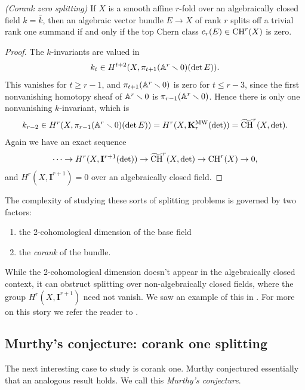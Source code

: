 \documentclass[11pt,openany]{book}
\providecommand{\KMW}{\mathbf{K}^\mathrm{MW}}
\providecommand{\CHW}{\widetilde{\mathrm{CH}}}
\begin{document}
\begin{theorem} \textit{(Corank zero splitting)} If $X$ is a smooth affine $r$-fold over an algebraically closed field $k = \bar{k}$, then an algebraic vector bundle $E \to X$ of rank $r$ splits off a trivial rank one summand if and only if the top Chern class $c_r(E) \in \mathrm{CH}^r(X)$ is zero.
\end{theorem}
\begin{proof} The $k$-invariants are valued in
\begin{align*}
    k_t \in H^{t+2}(X, \pi_{t+1}(\mathbb{A}^r\smallsetminus 0)(\det E)).
\end{align*}
This vanishes for $t\ge r-1$, and $\pi_{t+1}(\mathbb{A}^r\smallsetminus 0)$ is zero for $t \le r-3$, since the first nonvanishing homotopy sheaf of $\mathbb{A}^r\smallsetminus 0$ is $\pi_{r-1}(\mathbb{A}^r\smallsetminus 0)$. Hence there is only one nonvanishing $k$-invariant, which is
\begin{align*}
    k_{r-2} \in H^{r}(X, \pi_{r-1}(\A^r\minus 0)(\det E)) = H^r(X,\KMW_r(\det)) = \CHW^r(X,\det).
\end{align*}
%
Again we have an exact sequence
\begin{align*}
    \cdots \to H^r(X,\mathbf{I}^{r+1}(\det)) \to \CHW^r(X,\det) \to \CH^r(X) \to 0,
\end{align*}
and $H^r(X,\mathbf{I}^{r+1}) = 0$ over an algebraically closed field.
\end{proof}


The complexity of studying these sorts of splitting problems is governed by two factors:
\begin{enumerate}
    \item the 2-cohomological dimension of the base field
    \item the \textit{corank} of the bundle.
\end{enumerate}

While the 2-cohomological dimension doesn't appear in the algebraically closed context, it can obstruct splitting over non-algebraically closed fields, where the group $H^r(X,\mathbf{I}^{r+1})$ need not vanish. We saw an example of this in . For more on this story we refer the reader to \cite{AF2}.

\subsection{Murthy's conjecture: corank one splitting}



The next interesting case to study is corank one. Murthy conjectured essentially that an analogous result holds. We call this \textit{Murthy's conjecture}.
\end{document}
